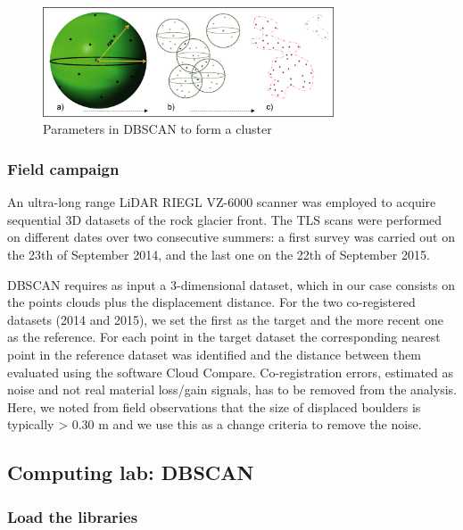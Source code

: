 \documentclass[
]{article}
\begin{document}
\begin{figure}

{\centering \includegraphics[width=3.4in]{images/parameters} 

}

\caption{Parameters in DBSCAN to form a cluster \label{dbscan}}\label{fig:fig2}
\end{figure}

\subsubsection{Field campaign}\label{field-campaign}

An ultra-long range LiDAR RIEGL VZ-6000 scanner was employed to acquire sequential 3D datasets of the rock glacier front.
The TLS scans were performed on different dates over two consecutive summers: a first survey was carried out on the 23th of September 2014, and the last one on the 22th of September 2015.

DBSCAN requires as input a 3-dimensional dataset, which in our case consists on the points clouds plus the displacement distance.
For the two co-registered datasets (2014 and 2015), we set the first as the target and the more recent one as the reference.
For each point in the target dataset the corresponding nearest point in the reference dataset was identified and the distance between them evaluated using the software Cloud Compare.
Co-registration errors, estimated as noise and not real material loss/gain signals, has to be removed from the analysis.
Here, we noted from field observations that the size of displaced boulders is typically \textgreater{} 0.30 m and we use this as a change criteria to remove the noise.

\subsection{Computing lab: DBSCAN}\label{computing-lab-dbscan}

\subsubsection{Load the libraries}\label{load-the-libraries-4}
\end{document}
